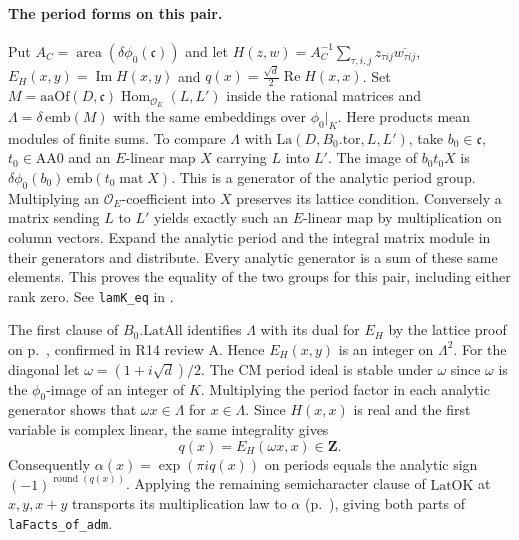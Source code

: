 \paragraph{The period forms on this pair.}\label{r14:kernel-lattice}
Put $A_C=\operatorname{area}(\delta\phi_0(\mathfrak c))$ and let
$H(z,w)=A_C^{-1}\sum_{\tau,i,j}z_{\tau ij}\overline{w_{\tau ij}}$,
$E_H(x,y)=\operatorname{Im} H(x,y)$ and
$q(x)=\frac{\sqrt d}{2}\operatorname{Re}H(x,x)$. Set
$M=\mathrm{aaOf}(D,\mathfrak c)\operatorname{Hom}_{\mathcal O_E}(L,L')$
inside the rational matrices and
$\Lambda=\delta\,\mathrm{emb}(M)$ with the same embeddings over $\phi_0|_K$.
Here products mean modules of finite sums. To compare $\Lambda$ with
$\mathrm{La}(D,B_0.\mathrm{tor},L,L')$, take $b_0\in\mathfrak c$,
$t_0\in\mathrm{AA0}$ and an $E$-linear map $X$ carrying $L$ into $L'$.
The image of $b_0t_0 X$ is
$\delta\phi_0(b_0)\,\mathrm{emb}(t_0\operatorname{mat}X)$.
This is a generator of the analytic period group. Multiplying an
$\mathcal O_E$-coefficient into $X$ preserves its lattice condition.
Conversely a matrix sending $L$ to $L'$ yields exactly such an $E$-linear
map by multiplication on column vectors. Expand the analytic period
and the integral matrix module in their generators and distribute.
Every analytic generator is a sum of these same elements. This proves
the equality of the two groups for this pair, including either rank
zero. See \nolinkurl{lamK_eq} in .

The first clause of $B_0.\mathrm{LatAll}$ identifies $\Lambda$ with
its dual for $E_H$ by the lattice proof on p.~\pageref{r14:lat-indices},
confirmed in R14 review A. Hence $E_H(x,y)$ is an integer on $\Lambda^2$.
For the diagonal let $\omega=(1+i\sqrt d)/2$. The CM period ideal is
stable under $\omega$ since $\omega$ is the $\phi_0$-image of an
integer of $K$. Multiplying the period factor in each analytic generator
shows that $\omega x\in\Lambda$ for $x\in\Lambda$. Since $H(x,x)$ is real
and the first variable is complex linear, the same integrality gives
\[
             q(x)=E_H(\omega x,x)\in\mathbf Z .
\]
Consequently $\alpha(x)=\exp(\pi i q(x))$ on periods equals the analytic
sign $(-1)^{\operatorname{round}(q(x))}$. Applying the remaining
semicharacter clause of $\mathrm{LatOK}$ at $x,y,x+y$ transports its
multiplication law to $\alpha$ (p.~\pageref{r14:lat-indices}), giving both
parts of \nolinkurl{laFacts_of_adm}.

